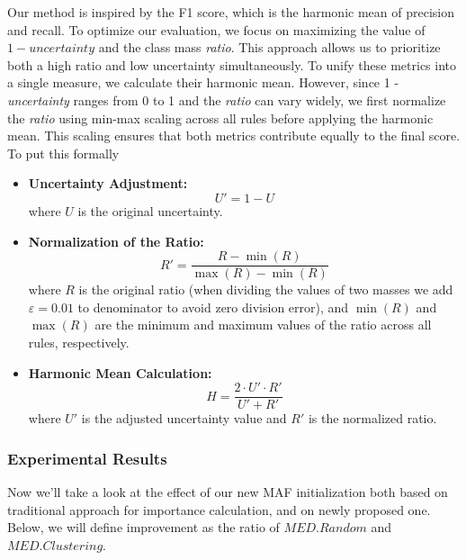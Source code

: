 \documentclass[10pt,a4paper,oneside]{article}
\begin{document}
Our method is inspired by the F1 score, which is the harmonic mean of precision and recall. To optimize our evaluation, we focus on maximizing the value of $1 - \textit{uncertainty}$ and the class mass \textit{ratio}. This approach allows us to prioritize both a high ratio and low uncertainty simultaneously. To unify these metrics into a single measure, we calculate their harmonic mean. However, since 1 - \textit{uncertainty} ranges from 0 to 1 and the \textit{ratio} can vary widely, we first normalize the \textit{ratio} using min-max scaling across all rules before applying the harmonic mean. This scaling ensures that both metrics contribute equally to the final score.
To put this formally 
\begin{itemize}
    \item \textbf{Uncertainty Adjustment:}
    \[
    U' = 1 - U
    \]
    where \( U \) is the original uncertainty.

    \item \textbf{Normalization of the Ratio:}
    \[
    R' = \frac{R - \min(R)}{\max(R) - \min(R)}
    \]
    where \( R \) is the original ratio (when dividing the values of two masses we add $\varepsilon=0.01$ to denominator to avoid zero division error), and \( \min(R) \) and \( \max(R) \) are the minimum and maximum values of the ratio across all rules, respectively.

    \item \textbf{Harmonic Mean Calculation:}
    \[
    H = \frac{2 \cdot U' \cdot R'}{U' + R'}
    \]
    where \( U' \) is the adjusted uncertainty value and \( R' \) is the normalized ratio.
\end{itemize}

\subsubsection{Experimental Results}
Now we'll take a look at the effect of our new MAF initialization both based on traditional approach for importance calculation, and on newly proposed one. Below, we will define improvement as the ratio of $MED. Random$ and $MED. Clustering$.

\FloatBarrier
\end{document}
